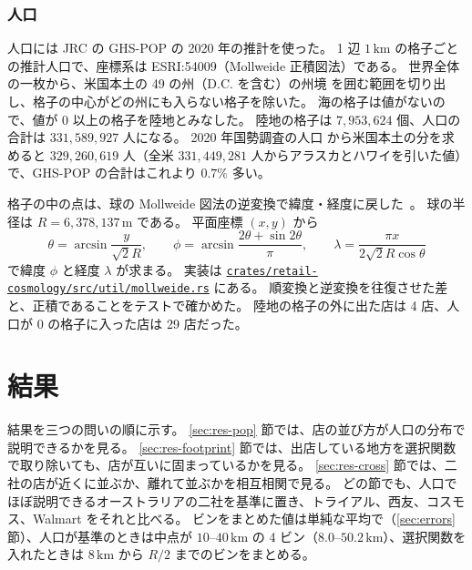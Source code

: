 \documentclass[a4paper,11pt]{ltjsarticle}
\newcommand{\repourl}{https://github.com/inuverse44/retail-cosmology}
\begin{document}
\subsubsection{人口}

人口には JRC の GHS-POP \cite{GHSPOP2023} の 2020 年の推計を使った。
1 辺 $1\,\mathrm{km}$ の格子ごとの推計人口で、座標系は ESRI:54009（Mollweide 正積図法）である。
世界全体の一枚から、米国本土の 49 の州（D.C. を含む）の州境 \cite{NaturalEarthAdmin1} を囲む範囲を切り出し、格子の中心がどの州にも入らない格子を除いた。
海の格子は値がないので、値が $0$ 以上の格子を陸地とみなした。
陸地の格子は $7{,}953{,}624$ 個、人口の合計は $331{,}589{,}927$ 人になる。
2020 年国勢調査の人口 \cite{Census2020Resident} から米国本土の分を求めると $329{,}260{,}619$ 人（全米 $331{,}449{,}281$ 人からアラスカとハワイを引いた値）で、GHS-POP の合計はこれより $0.7\%$ 多い。

格子の中の点は、球の Mollweide 図法の逆変換で緯度・経度に戻した~\cite{Snyder1987}。
球の半径は $R = 6{,}378{,}137\,\mathrm{m}$ である。
平面座標 $(x, y)$ から
\begin{equation}
  \theta = \arcsin \frac{y}{\sqrt{2} R}, \qquad
  \phi = \arcsin \frac{2\theta + \sin 2\theta}{\pi}, \qquad
  \lambda = \frac{\pi x}{2\sqrt{2} R \cos\theta}
\end{equation}
で緯度 $\phi$ と経度 $\lambda$ が求まる。
実装は \href{\repourl/blob/main/crates/retail-cosmology/src/util/mollweide.rs}{\nolinkurl{crates/retail-cosmology/src/util/mollweide.rs}} にある。
順変換と逆変換を往復させた差と、正積であることをテストで確かめた。
陸地の格子の外に出た店は 4 店、人口が $0$ の格子に入った店は 29 店だった。

\section{結果}
\label{sec:results}

結果を三つの問いの順に示す。
\ref{sec:res-pop} 節では、店の並び方が人口の分布で説明できるかを見る。
\ref{sec:res-footprint} 節では、出店している地方を選択関数で取り除いても、店が互いに固まっているかを見る。
\ref{sec:res-cross} 節では、二社の店が近くに並ぶか、離れて並ぶかを相互相関で見る。
どの節でも、人口でほぼ説明できるオーストラリアの二社を基準に置き、トライアル、西友、コスモス、Walmart をそれと比べる。
ビンをまとめた値は単純な平均で（\ref{sec:errors} 節）、人口が基準のときは中点が $10$--$40\,\mathrm{km}$ の 4 ビン（$8.0$--$50.2\,\mathrm{km}$）、選択関数を入れたときは $8\,\mathrm{km}$ から $R/2$ までのビンをまとめる。
\end{document}

